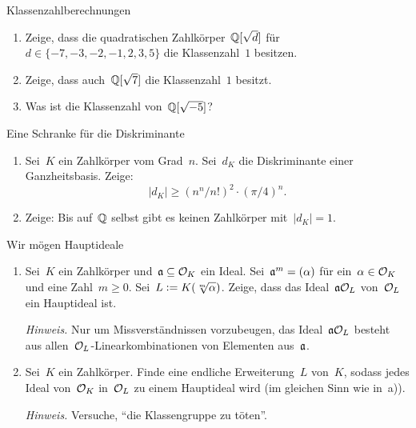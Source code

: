 \documentclass{uebblatt}
\begin{document}

\begin{aufgabe}{Klassenzahlberechnungen}
\begin{enumerate}
\item Zeige, dass die quadratischen Zahlkörper~$\mathbb{Q}[\sqrt{d}]$ für~$d \in \{
-7, -3, -2, -1, 2, 3, 5 \}$ die Klassenzahl~$1$ besitzen.
\item Zeige, dass auch~$\mathbb{Q}[\sqrt{7}]$ die Klassenzahl~$1$ besitzt.
\item Was ist die Klassenzahl von~$\mathbb{Q}[\sqrt{-5}]$?
\end{enumerate}
\end{aufgabe}

\begin{aufgabe}{Eine Schranke für die Diskriminante}
\begin{enumerate}
\item Sei~$K$ ein Zahlkörper vom Grad~$n$. Sei~$d_K$ die Diskriminante einer
Ganzheitsbasis. Zeige:
\[ |d_K| \geq (n^n / n!)^2 \cdot (\pi/4)^n. \]
\item Zeige: Bis auf~$\mathbb{Q}$ selbst gibt es keinen Zahlkörper mit~$|d_K| = 1$.
\end{enumerate}
\end{aufgabe}

\begin{aufgabe}{Wir mögen Hauptideale}
\begin{enumerate}
\item Sei~$K$ ein Zahlkörper und~$\mathfrak{a} \subseteq \mathcal{O}_K$ ein Ideal. Sei~$\mathfrak{a}^m =
(\alpha)$ für ein~$\alpha \in \mathcal{O}_K$ und eine Zahl~$m \geq 0$. Sei~$L \vcentcolon=
K(\sqrt[m]{\alpha})$. Zeige, dass das Ideal~$\mathfrak{a} \mathcal{O}_L$ von~$\mathcal{O}_L$ ein
Hauptideal ist.

{\tiny\emph{Hinweis.} Nur um Missverständnissen vorzubeugen, das
Ideal~$\mathfrak{a}\mathcal{O}_L$ besteht aus allen~$\mathcal{O}_L$-Linearkombinationen von Elementen
aus~$\mathfrak{a}$.\par}
\item Sei~$K$ ein Zahlkörper. Finde eine endliche Erweiterung~$L$ von~$K$,
sodass jedes Ideal von~$\mathcal{O}_K$ in~$\mathcal{O}_L$ zu einem Hauptideal wird (im gleichen
Sinn wie in~a)).

{\tiny\emph{Hinweis.} Versuche, "`die Klassengruppe zu töten"'.\par}
\end{enumerate}
\end{aufgabe}
\end{document}
